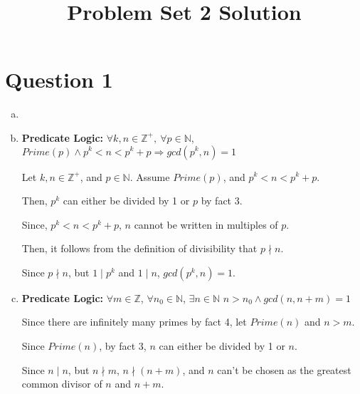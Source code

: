 \documentclass[12pt]{article}
\begin{document}
\title{Problem Set 2 Solution}
\maketitle

\section*{Question 1}
\begin{enumerate}[a.]
    \item

    \item

    \textbf{Predicate Logic:} $\forall k,n \in \mathbb{Z}^{+},\:\forall p \in
    \mathbb{N}$, $Prime(p) \land p^k < n < p^k + p \Rightarrow gcd(p^k,n) = 1$

    \bigskip

    Let $k,n \in \mathbb{Z}^{+}$, and $p \in \mathbb{N}$. Assume $Prime(p)$, and
    $p^k < n < p^k + p$.

    \bigskip

    Then, $p^k$ can either be divided by 1 or $p$ by fact 3.

    \bigskip

    Since, $p^k < n < p^k + p$, $n$ cannot be written in multiples of $p$.

    \bigskip

    Then, it follows from the definition of divisibility that $p \nmid n$.

    \bigskip

    Since $p \nmid n$, but $1 \mid p^k$ and $1 \mid n$, $gcd(p^k, n) = 1$.

    \item

    \textbf{Predicate Logic:} $\forall m \in \mathbb{Z}$, $\forall n_0 \in \mathbb{N}$,
    $\exists n \in \mathbb{N}$ $n > n_0 \land gcd(n, n+m) = 1$

    \bigskip

    Since there are infinitely many primes by fact 4, let $Prime(n)$ and $n > m$.

    \bigskip

    Since $Prime(n)$, by fact 3, $n$ can either be divided by 1 or $n$.

    \bigskip

    Since $n \mid n$, but $n \nmid m$, $n \nmid (n+m)$, and $n$ can't be chosen
    as the greatest common divisor of $n$ and $n+m$.

    \bigskip


\end{enumerate}
\end{document}
